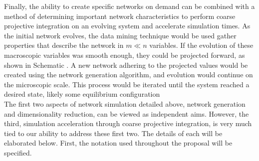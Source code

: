 \documentclass[11pt]{article}
\begin{document}
Finally, the ability to create specific networks on demand can be combined with a method of determining important network characteristics to perform coarse projective integration on an evolving system and accelerate simulation times. As the initial network evolves, the data mining technique would be used gather properties that describe the network in $m \ll n$ variables. If the evolution of these macroscopic variables was smooth enough, they could be projected forward, as shown in Schematic \cite{cpi_schematic}. A new network adhering to the projected values would be created using the network generation algorithm, and evolution would continue on the microscopic scale. This process would be iterated until the system reached a desired state, likely some equilibrium configuration \vspace{1mm}\\
The first two aspects of network simulation detailed above, network generation and dimensionality reduction, can be viewed as independent aims. However, the third, simulation acceleration through coarse projective integration, is very much tied to our ability to address these first two. The details of each will be elaborated below. First, the notation used throughout the proposal will be specified.
\end{document}

